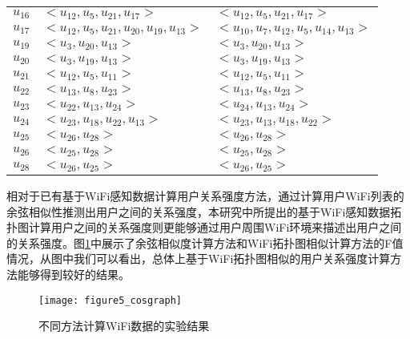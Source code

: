 \begin{table}[htbp]
\begin{tabular}{cll}
      \mbox{$u_{16}$} &\mbox{$ <u_{12},u_{5},u_{21},u_{17}>$} &\mbox{$ <u_{12},u_{5},u_{21},u_{17}>$} \\
      \mbox{$u_{17} $}& \mbox{$< u_{12},u_{5},u_{21},u_{20},u_{19},u_{13}   >$} & \mbox{$< u_{10},u_{7},u_{12},u_{5},u_{14},u_{13}   >$}\\
      \mbox{$u_{19} $}&\mbox{$ <u_{3},u_{20},u_{13}>$} &\mbox{$ <u_{3},u_{20},u_{13}>$}\\
      \mbox{$u_{20}$} & \mbox{$<u_{3},u_{19},u_{13}>$} & \mbox{$<u_{3},u_{19},u_{13}>$}\\
      \mbox{$u_{21}$} & \mbox{$ <u_{12},u_{5},u_{11}>$} & \mbox{$ <u_{12},u_{5},u_{11}>$}\\
      \mbox{$u_{22} $}& \mbox{$ <u_{13},u_{8},u_{23}>$} & \mbox{$ <u_{13},u_{8},u_{23}>$}\\
      \mbox{$u_{23}$} & \mbox{$ <u_{22},u_{13},u_{24}>$} & \mbox{$ <u_{24},u_{13},u_{24}>$}\\
      \mbox{$u_{24}$} &\mbox{$ <u_{23},u_{18},u_{22},u_{13}>$} &\mbox{$ <u_{23},u_{13},u_{18},u_{22}>$}\\
      \mbox{$u_{25} $}&\mbox{$ <u_{26},u_{28}>$} &\mbox{$ <u_{26},u_{28}>$}\\
      \mbox{$u_{26} $}&\mbox{$ <u_{25},u_{28}>$} &\mbox{$ <u_{25},u_{28}>$}\\
      \mbox{$u_{28}$} &\mbox{$ <u_{26},u_{25}>$} &\mbox{$ <u_{26},u_{25}>$}\\
      \bottomrule[1.5pt]
    \end{tabular}
\end{table}
\par 相对于已有基于WiFi感知数据计算用户关系强度方法，通过计算用户WiFi列表的余弦相似性推测出用户之间的关系强度，本研究中所提出的基于WiFi感知数据拓扑图计算用户之间的关系强度则更能够通过用户周围WiFi环境来描述出用户之间的关系强度。图\ref{fig:cosgraph}中展示了余弦相似度计算方法和WiFi拓扑图相似计算方法的F值情况，从图中我们可以看出，总体上基于WiFi拓扑图相似的用户关系强度计算方法能够得到较好的结果。
\begin{figure}[htb]
\centering
\texttt{[image: figure5\_cosgraph]}
\caption{不同方法计算WiFi数据的实验结果}
\label{fig:cosgraph}
\end{figure}

\newpage
